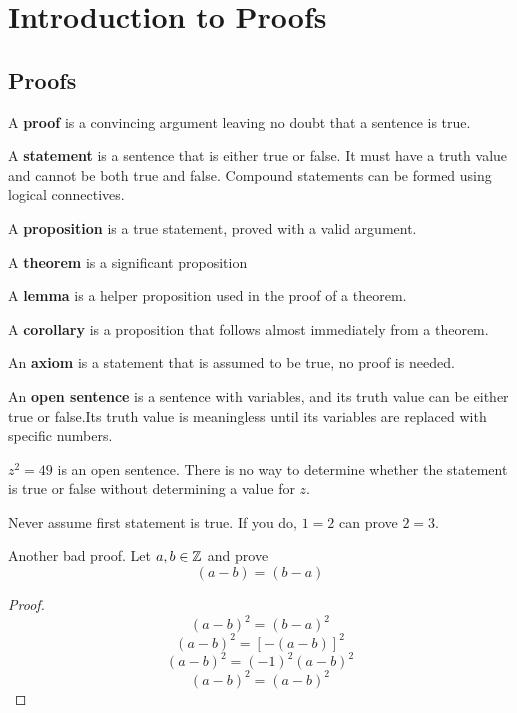 \documentclass[english, 12pt]{article}
\begin{document}
\notesheader
\section{Introduction to Proofs}
\subsection{Proofs}
\begin{defn}[proof]\th\label{proof}
A {\bf proof} is a convincing argument leaving no doubt that a sentence is true. 
\end{defn}

\begin{defn}[statement]\th\label{statement}
A {\bf statement} is a sentence that is either true or false. It must have a truth value and cannot be both true and false. Compound statements can be formed using logical connectives.
\end{defn}

\begin{defn}
A \textbf{proposition} is a true statement, proved with a valid argument.
\end{defn}
\begin{defn}
A \textbf{theorem} is a significant proposition
\end{defn}
\begin{defn} A \textbf{lemma} is a helper proposition used in the proof of a theorem.
\end{defn}
\begin{defn} 
A \textbf{corollary} is a proposition that follows almost immediately from a theorem.
\end{defn}
\begin{defn}
An \textbf{axiom} is a statement that is assumed to be true, no proof is needed.
\end{defn}

\begin{defn}\th\label{osentence}
An {\bf open sentence} is a sentence with variables, and its truth value can be either true or false.Its truth value is meaningless until its variables are replaced with specific numbers.
\end{defn}
\begin{exmp}
$z^2=49$ is an open sentence. There is no way to determine whether the statement is true or false without determining a value for $z$.
 \end{exmp}
\begin{note}
Never assume first statement is true. If you do, $ 1=2$ can prove $2=3$.
\begin{exmp}
Another bad proof. Let $a,b \in {\mathbb{Z}}$ and prove 
\[ (a-b) = (b-a)\]
\begin{proof}
\[ (a-b)^2 = (b-a)^2\]
\[ (a-b)^2 = [-(a-b)]^2\]
\[ (a-b)^2 = (-1)^2(a-b)^2\]
\[ (a-b)^2 = (a-b)^2\]
\end{proof}
\end{exmp}
\end{note}
\end{document}
